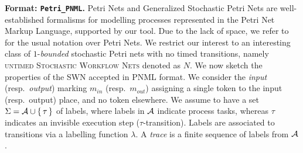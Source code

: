 \textbf{{Format: \texttt{Petri\_PNML}}.} Petri Nets and Generalized Stochastic Petri Nets are well-established formalisms \cite{DBLP:journals/tosem/PolyvyanyySWCM20} for modelling processes \cite{RoggeSoltiAW13} represented in the Petri Net Markup Language, supported by our tool. Due to the lack of space, we refer to \cite{spdwe} for the usual notation over Petri Nets. We restrict our interest to an interesting class of $1$-\textit{bounded} stochastic Petri nets with no timed transitions, namely \textsc{untimed Stochastic Workflow Nets} denoted as $N$. We now sketch the properties of the SWN accepted in PNML format. We consider  the \emph{input} (resp.~\emph{output}) marking $m_{in}$ (resp.~$m_{out}$) assigning a single token to the input (resp.~output) place, and no token elsewhere. We assume to have a set $\Sigma = \mathcal{A} \cup \set{\tau}$ of labels, where labels in $\mathcal{A}$ indicate process tasks, whereas $\tau$ indicates an invisible execution step ($\tau$-transition). Labels are associated to transitions via a labelling function $\lambda$. A \emph{trace} is a finite sequence of labels from $\mathcal{A}$.
